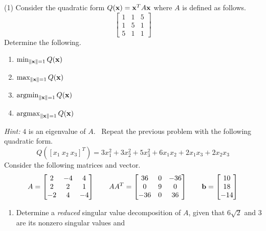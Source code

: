 \begin{tasks}[resume, style=enumerate](1)
\task
  Consider the quadratic form $Q(\mathbf x) = \mathbf x^T A \mathbf x$ where $A$ is
  defined as follows.
  \begin{displaymath}
    \begin{bmatrix}
      1 & 1 & 5 \\
      1 & 5 & 1 \\
      5 & 1 & 1
    \end{bmatrix}
  \end{displaymath}
  Determine the following.
  \begin{enumerate}[label=(\alph*)]
  \item
    $\min_{\|\mathbf x\| = 1} Q(\mathbf x)$
  \item
    $\max_{\|\mathbf x\| = 1}  Q(\mathbf x)$
  \item
    $\operatorname{\mathrm{argmin}}_{\|\mathbf x\| = 1} Q(\mathbf x)$
  \item
    $\operatorname{\mathrm{argmax}}_{\|\mathbf x\| = 1} Q(\mathbf x)$
  \end{enumerate}
  \textit{Hint:} $4$ is an eigenvalue of $A$.
\task
  \faCalculator \ Repeat the previous problem with the following
  quadratic form.
  \begin{displaymath}
    Q([x_1 \ x_2 \ x_3]^T) =
    3x_1^2 + 3x_2^2 + 5x_3^2 + 6x_1 x_2 + 2x_1 x_3 + 2x_2 x_3
  \end{displaymath}
\task
Consider the following matrices and vector.
  \begin{displaymath}
    A =
    \begin{bmatrix}
      2 & -4 & 4 \\
      2 & 2 & 1 \\
      -2 & 4 & -4 \\
    \end{bmatrix}
    \qquad
    AA^T =
    \begin{bmatrix}
      36 & 0 & -36 \\
      0 & 9 & 0 \\
      -36 & 0 & 36
    \end{bmatrix}
    \qquad
    \mathbf b =
    \begin{bmatrix}
      10 \\ 18 \\ -14
    \end{bmatrix}
  \end{displaymath}
  \begin{enumerate}[label=(\alph*)]
  \item
    Determine a \textit{reduced} singular value decomposition of $A$,
    given that $6\sqrt{2}$ and $3$ are its nonzero singular values and

\end{enumerate}
\end{tasks}
